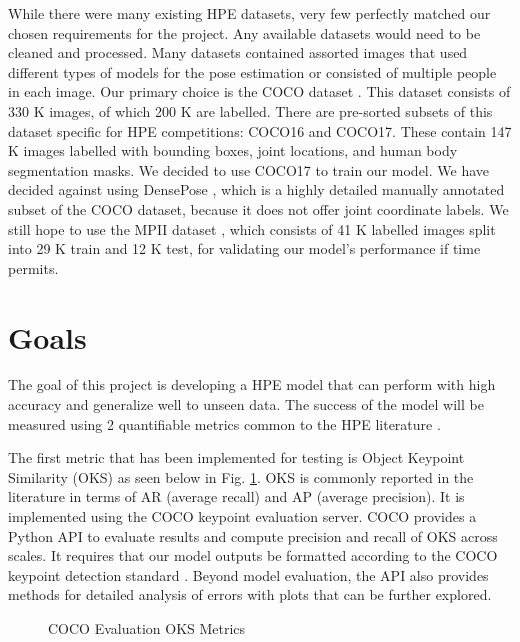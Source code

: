 \documentclass[11pt, letterpaper]{article}
\begin{document}
While there were many existing HPE datasets, very few perfectly matched our chosen requirements for the project. Any available datasets would need to be cleaned and processed. Many datasets contained assorted images that used different types of models for the pose estimation or consisted of multiple people in each image. Our primary choice is the COCO dataset \cite{coco_data}. This dataset consists of 330 K images, of which 200 K are labelled. There are pre-sorted subsets of this dataset specific for HPE competitions: COCO16 and COCO17. These contain 147 K images labelled with bounding boxes, joint locations, and human body segmentation masks. We decided to use COCO17 to train our model. We have decided against using DensePose \cite{densepose}, which is a highly detailed manually annotated subset of the COCO dataset, because it does not offer joint coordinate labels. We still hope to use the MPII dataset \cite{mpii}, which consists of 41 K labelled images split into 29 K train and 12 K test, for validating our model’s performance if time permits. 

\section{Goals}
\label{SectionGoals}

The goal of this project is developing a HPE model that can perform with high accuracy and generalize well to unseen data. The success of the model will be measured using 2 quantifiable metrics common to the HPE literature \cite{Babu_2019}. 

The first metric that has been implemented for testing is Object Keypoint Similarity (OKS) as seen below in Fig. \ref{fig:oks_evaluation_metrics}. OKS is commonly reported in the literature in terms of AR (average recall) and AP (average precision). It is implemented using the COCO keypoint evaluation server. COCO provides a Python API \cite{coco_keypoints} to evaluate results and compute precision and recall of OKS across scales. It requires that our model outputs be formatted according to the COCO keypoint detection standard \cite{coco_format_results}. Beyond model evaluation, the API also provides methods for detailed analysis of errors with plots that can be further explored.

\begin{figure}
    \centering
    \caption{COCO Evaluation OKS Metrics}
    \label{fig:oks_evaluation_metrics}
\end{figure}
\end{document}
